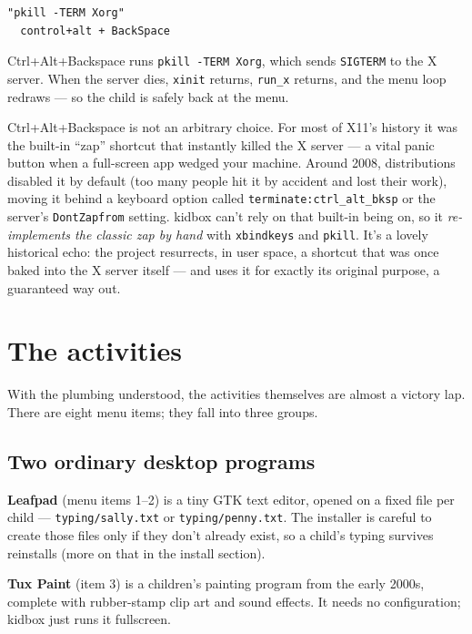 \documentclass[11pt,oneside]{article}
\newcommand{\code}[1]{\texorpdfstring{\textcolor{kbblue}{\texttt{#1}}}{#1}}
\newcommand{\file}[1]{\textcolor{kbteal}{\texttt{#1}}}
\begin{document}
\begin{lstlisting}
"pkill -TERM Xorg"
  control+alt + BackSpace
\end{lstlisting}

Ctrl+Alt+Backspace runs \code{pkill -TERM Xorg}, which sends \texttt{SIGTERM} to
the X server. When the server dies, \texttt{xinit} returns, \code{run\_x}
returns, and the menu loop redraws --- so the child is safely back at the menu.

\begin{deeper}
Ctrl+Alt+Backspace is not an arbitrary choice. For most of X11's history it was
the built-in ``zap'' shortcut that instantly killed the X server --- a vital
panic button when a full-screen app wedged your machine. Around 2008,
distributions disabled it by default (too many people hit it by accident and
lost their work), moving it behind a keyboard option called
\texttt{terminate:ctrl\_alt\_bksp} or the server's \code{DontZapfrom} setting.
kidbox can't rely on that built-in being on, so it \emph{re-implements the
classic zap by hand} with \texttt{xbindkeys} and \texttt{pkill}. It's a lovely
historical echo: the project resurrects, in user space, a shortcut that was once
baked into the X server itself --- and uses it for exactly its original purpose,
a guaranteed way out.
\end{deeper}

\section{The activities}

With the plumbing understood, the activities themselves are almost a victory
lap. There are eight menu items; they fall into three groups.

\subsection{Two ordinary desktop programs}

\textbf{Leafpad} (menu items 1--2) is a tiny GTK text editor, opened on a fixed
file per child --- \file{typing/sally.txt} or \file{typing/penny.txt}. The
installer is careful to create those files only if they don't already exist, so
a child's typing survives reinstalls (more on that in the install section).

\textbf{Tux Paint} (item 3) is a children's painting program from the early
2000s, complete with rubber-stamp clip art and sound effects. It needs no
configuration; kidbox just runs it fullscreen.
\end{document}
